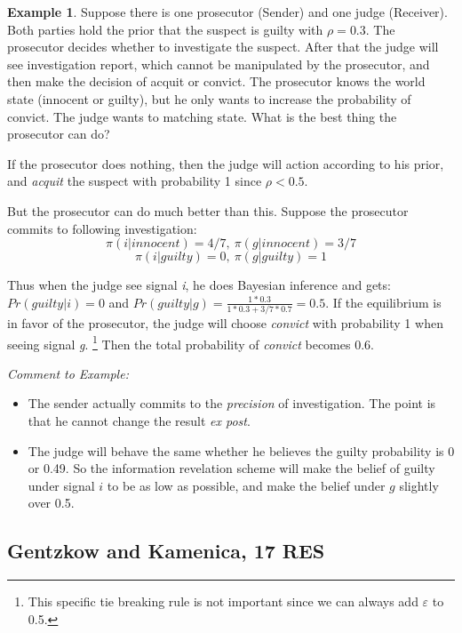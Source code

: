 \documentclass{book}
\theoremstyle{plain}
\theoremstyle{definition}
\newtheorem{exmp}{Example}[section] %
\begin{document}
\begin{exmp}
Suppose there is one prosecutor (Sender) and one judge (Receiver).
Both parties hold the prior that the suspect is guilty with $\rho=0.3$.
The prosecutor decides whether to investigate the suspect. 
After that the judge will see investigation report, which cannot be manipulated by the prosecutor, and then make the decision of acquit or convict.
The prosecutor knows the world state (innocent or guilty), but he only wants to increase the probability of convict.
The judge wants to matching state.
What is the best thing the prosecutor can do?

If the prosecutor does nothing, then the judge will action according to his prior, and \textit{acquit} the suspect with probability 1 since $\rho<0.5$. 

But the prosecutor can do much better than this.
Suppose the prosecutor commits to following investigation:
\[\pi(i|innocent)=4/7, \ \pi(g|innocent)=3/7\]
\[\pi(i|guilty)=0, \ \pi(g|guilty)=1\]

Thus when the judge see signal \textit{i}, he does Bayesian inference and gets:
\(Pr(guilty|i)=0\)
and 
\(Pr(guilty|g)=\frac{1*0.3}
{1*0.3+3/7*0.7}=0.5\).
If the equilibrium is in favor of the prosecutor, the judge will choose \textit{convict} with probability 1 when seeing signal \textit{g}.
\footnote{This specific tie breaking rule is not important since we can always add $\varepsilon$ to 0.5.}
Then the total probability of \textit{convict} becomes 0.6.
\end{exmp}

\noindent
\textit{Comment to Example:}
\begin{itemize}
	\item The sender actually commits to the \textit{precision} of investigation. The point is that he cannot change the result \textit{ex post}.

	\item The judge will behave the same whether he believes the guilty probability is 0 or 0.49. So the information revelation scheme will make the belief of guilty under signal $i$ to be as low as possible, and make the belief under $g$ slightly over 0.5.
\end{itemize}

\subsection{Gentzkow and Kamenica, 17 RES} %
\label{sub:gentzkow_and_kamenica_17_res}
\end{document}
